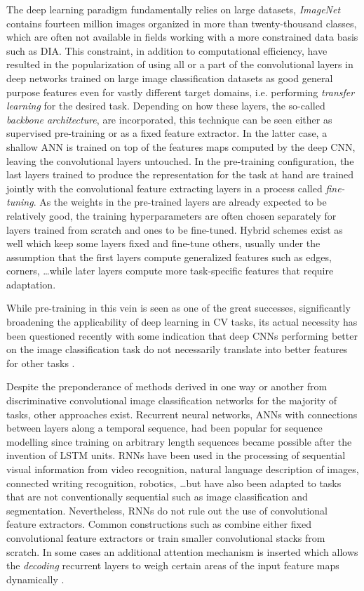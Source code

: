 The deep learning paradigm fundamentally relies on large datasets,
\emph{ImageNet} contains fourteen million images organized in more than
twenty-thousand classes, which are often not available in fields working with a
more constrained data basis such as DIA. This constraint, in addition to
computational efficiency, have resulted in the popularization of using all or a
part of the convolutional layers in deep networks trained on large image
classification datasets as good general purpose features even for vastly
different target domains, i.e. performing \emph{transfer learning} for the
desired task. Depending on how these layers, the so-called \emph{backbone
architecture}, are incorporated, this technique can be seen either as
supervised pre-training or as a fixed feature extractor.  In the latter case, a
shallow ANN is trained on top of the features maps computed by the deep CNN,
leaving the convolutional layers untouched. In the pre-training configuration,
the last layers trained to produce the representation for the task at hand are
trained jointly with the convolutional feature extracting layers in a process
called \emph{fine-tuning}. As the weights in the pre-trained layers are already
expected to be relatively good, the training hyperparameters are often chosen
separately for layers trained from scratch and ones to be fine-tuned. Hybrid
schemes exist as well which keep some layers fixed and fine-tune others,
usually under the assumption that the first layers compute generalized features
such as edges, corners, \dots while later layers compute more task-specific
features that require adaptation.

While pre-training in this vein is seen as one of the great successes,
significantly broadening the applicability of deep learning in CV
tasks\cite{huh2016makes}, its actual necessity has been questioned recently
\cite{he2019rethinking,zoph2020rethinking} with some indication that deep CNNs
performing better on the image classification task do not necessarily translate
into better features for other tasks \cite{kornblith2019better}. 

Despite the preponderance of methods derived in one way or another from
discriminative convolutional image classification networks for the majority of
tasks, other approaches exist. Recurrent neural networks, ANNs with connections
between layers along a temporal sequence, had been popular for sequence
modelling since training on arbitrary length sequences became possible after
the invention of LSTM units. RNNs have been used in the processing of
sequential visual information from video recognition, natural language
description of images, connected writing recognition, robotics, \dots but have
also been adapted to tasks that are not conventionally sequential such as image
classification \cite{visin2015renet} and \cite{stollenga2015parallel}
segmentation. Nevertheless, RNNs do not rule out the use of convolutional
feature extractors. Common constructions such as \cite{shi2016end} combine
either fixed convolutional feature extractors or train smaller convolutional
stacks from scratch. In some cases an additional attention mechanism is
inserted which allows the \emph{decoding} recurrent layers to weigh certain
areas of the input feature maps dynamically \cite{xu2015show}.

